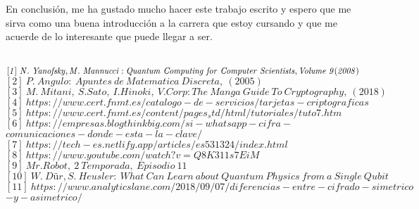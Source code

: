 \documentclass[12pt,a4paper]{book}
\theoremstyle{change}
\begin{document}
	En conclusión, me ha gustado mucho hacer este trabajo escrito y espero que me sirva como una buena introducción a la carrera que estoy cursando y que me acuerde de lo interesante que puede llegar a ser.
%	
%	
	\begin{thebibliography}\\
	$\mathit{[1]~N.~Yanofsky,M.~Mannucci:
		Quantum~Computing~for~Computer~Scientists,\\Volume~9(2008)}$\\
	\vspace{2mm}
	$\mathit{[2]~P.~Angulo:~
		Apuntes~de~Matematica~Discreta,~(2005)}$\\
	\vspace{2mm}
	$\mathit{[3]~M.~Mitani,~S.Sato,~I.Hinoki,~V.Corp:
		The~Manga~Guide~To~Cryptography,~(2018)}$\\
	\vspace{2mm}
	$\mathit{[4]~https://www.cert.fnmt.es/catalogo-de-servicios/tarjetas-criptograficas}$\\
	\vspace{2mm}
	$\mathit{[5]~https://www.cert.fnmt.es/content/pages_std/html/tutoriales/tuto7.htm}$\\
	\vspace{2mm}
	$\mathit{[6]~https://empresas.blogthinkbig.com/si-whatsapp-cifra-}$\\ \vspace{1mm}
	$comunicaciones-donde-esta-la-clave/$\\
	\vspace{2mm}
	$\mathit{[7]~https://tech-es.netlify.app/articles/es531324/index.html}$\\
	\vspace{2mm}
	$\mathit{[8]~https://www.youtube.com/watch?v=Q8K311s7EiM}$\\
	\vspace{2mm}
	$\mathit{[9]~Mr.Robot,~2~Temporada,~Episodio~11}$\\
	\vspace{2mm}
	$\mathit{[10]~W.~Dür,S.~Heusler:~What~Can~Learn~about~Quantum~Physics~from~a~Single~Qubit}$\\
	\vspace{2mm}
	$\mathit{[11]~https://www.analyticslane.com/2018/09/07/diferencias-entre-cifrado-simetrico}$\\
	\vspace{2mm}
	$\mathit{-y-asimetrico/}$
	
\end{thebibliography}
	
	
\end{document}
